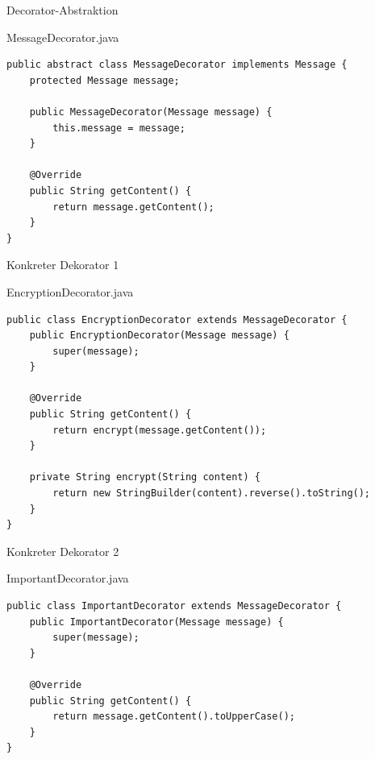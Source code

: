 \begin{frame}[fragile]{Decorator-Abstraktion}
	\begin{exampleblock}{MessageDecorator.java}
        \begin{lstlisting}
public abstract class MessageDecorator implements Message {
    protected Message message;

    public MessageDecorator(Message message) {
        this.message = message;
    }

    @Override
    public String getContent() {
        return message.getContent();
    }
}

        \end{lstlisting}
	\end{exampleblock}
\end{frame}

\begin{frame}[fragile]{Konkreter Dekorator 1}
	\begin{exampleblock}{EncryptionDecorator.java}
        \begin{lstlisting}
public class EncryptionDecorator extends MessageDecorator {
    public EncryptionDecorator(Message message) {
        super(message);
    }

    @Override
    public String getContent() {
        return encrypt(message.getContent());
    }

    private String encrypt(String content) {
        return new StringBuilder(content).reverse().toString();
    }
}
        \end{lstlisting}
	\end{exampleblock}
\end{frame}

\begin{frame}[fragile]{Konkreter Dekorator 2}
	\begin{exampleblock}{ImportantDecorator.java}
        \begin{lstlisting}
public class ImportantDecorator extends MessageDecorator {
    public ImportantDecorator(Message message) {
        super(message);
    }

    @Override
    public String getContent() {
        return message.getContent().toUpperCase();
    }
}
        \end{lstlisting}
	\end{exampleblock}
\end{frame}


